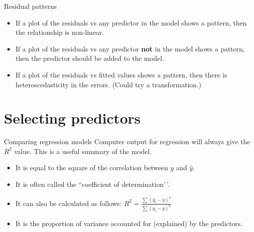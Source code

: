 \documentclass[
  14pt,
  ignorenonframetext,
  aspectratio=169,
]{beamer}
\begin{document}
\begin{frame}{Residual patterns}
\protect{}\label{residual-patterns}
\begin{itemize}
\item
  If a plot of the residuals vs any predictor in the model shows a
  pattern, then the relationship is non-linear.
\item
  If a plot of the residuals vs any predictor \textbf{not} in the model
  shows a pattern, then the predictor should be added to the model.
\item
  If a plot of the residuals vs fitted values shows a pattern, then
  there is heteroscedasticity in the errors. (Could try a
  transformation.)
\end{itemize}
\end{frame}

\section{Selecting predictors}\label{selecting-predictors}

\begin{frame}{Comparing regression models}
\protect{}\label{comparing-regression-models}
Computer output for regression will always give the \(R^2\) value. This
is a useful summary of the model.

\begin{itemize}
\item
  It is equal to the square of the correlation between \(y\) and
  \(\hat y\).
\item
  It is often called the ``coefficient of determination'\,'.
\item
  It can also be calculated as follows:
  \(R^2 = \frac{\sum(\hat{y}_t - \bar{y})^2}{\sum(y_t-\bar{y})^2}\)
\item
  It is the proportion of variance accounted for (explained) by the
  predictors.
\end{itemize}
\end{frame}
\end{document}
